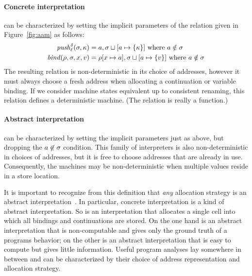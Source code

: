 \documentclass[preprint,onecolumn,9pt]{sigplanconf} %
\begin{document}
\paragraph{Concrete interpretation} can be characterized by setting the implicit
parameters of the relation given in Figure~\ref{fig:aam} as follows:
\begin{align*}
\mathit{push}_{\ell}^{\delta}(\sigma,\kappa) &= a,\sigma\sqcup[a\mapsto\{\kappa\}]
\mbox{ where }a \notin\sigma
\\
\mathit{bind}(\rho,\sigma,x,v) &= \rho[x\mapsto a],\sigma\sqcup[a\mapsto\{v\}]
\mbox{ where }a \notin\sigma
\end{align*}
The resulting relation is non-deterministic in its choice of
addresses, however it must always choose a fresh address when
allocating a continuation or variable binding.  If we consider machine
states equivalent up to consistent renaming, this relation defines
a deterministic machine.  (The relation is really a function.)


\paragraph{Abstract interpretation} can be characterized by setting the implicit
parameters just as above, but dropping the $a \not\in \sigma$
condition.  This family of interpreters is also non-deterministic in
choices of addresses, but it is free to choose addresses that are
already in use.  Consequently, the machines may be non-deterministic
when multiple values reside in a store location.

It is important to recognize from this definition that \emph{any}
allocation strategy is an abstract
interpretation~\cite{dvanhorn:Might2009Posteriori}.  In particular,
concrete interpretation is a kind of abstract interpretation.  So is
an interpretation that allocates a single cell into which all bindings
and continuations are stored.  On the one hand is an abstract
interpretation that is non-computable and gives only the ground truth
of a programs behavior; on the other is an abstract interpretation
that is easy to compute but gives little information.  Useful program
analyses lay somewhere in between and can be characterized by their
choice of address representation and allocation strategy.

\end{document}
